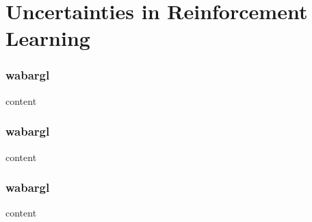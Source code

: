 \section{Uncertainties in Reinforcement Learning}
\begin{frame}
    \frametitle{wabargl}

    content
\end{frame}
\begin{frame}
    \frametitle{wabargl}

    content
\end{frame}
\begin{frame}
    \frametitle{wabargl}

    content
\end{frame}


